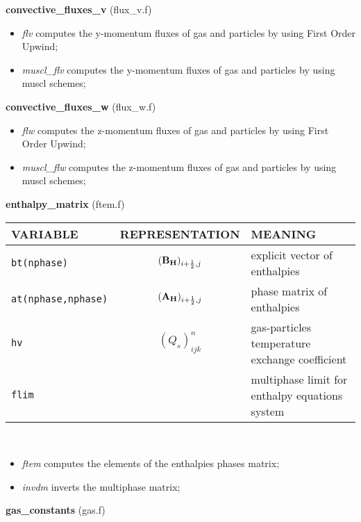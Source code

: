 %
%
{\large{\bf convective\_fluxes\_v}} (flux\_v.f)\\
\begin{itemize}
\item {\em flv} computes the y-momentum fluxes of gas and particles by using First Order Upwind;
\item {\em muscl\_flv} computes the y-momentum fluxes of gas and particles by using muscl schemes;
\end{itemize}
%
%
{\large{\bf convective\_fluxes\_w}} (flux\_w.f)\\
\begin{itemize}
\item {\em flw} computes the z-momentum fluxes of gas and particles by using First Order Upwind;
\item {\em muscl\_flw} computes the z-momentum fluxes of gas and particles by using muscl schemes;
\end{itemize}
%
%
{\large{\bf enthalpy\_matrix}} (ftem.f)\\[5mm]
\begin{tabular}{|p{6cm}|c|p{6cm}|}\hline
VARIABLE & REPRESENTATION & MEANING\\\hline
\tt bt(nphase)  & $({\bf B_H})_{i+\frac{1}{2},j}$ & explicit vector 
of enthalpies \\ \hline
\tt at(nphase,nphase) & $({\bf A_H})_{i+\frac{1}{2},j}$ & phase matrix of enthalpies\\\hline
\tt hv               & $(Q_s)_{ijk}^n$ & gas-particles temperature exchange coefficient\\\hline
\tt flim             &                 & multiphase limit for enthalpy equations system\\\hline
\end{tabular}\\
\begin{itemize}
\item{\em ftem} computes the elements of the enthalpies phases matrix;
\item{\em invdm} inverts the multiphase matrix;
\end{itemize}
%
%
{\large {\bf gas\_constants}} (gas.f)\\[5mm]
